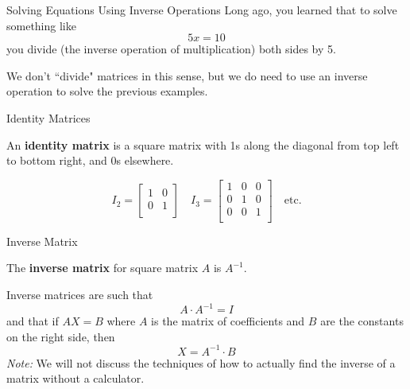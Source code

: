 \documentclass[t]{beamer}
\begin{document}
\begin{frame}{Solving Equations Using Inverse Operations}
Long ago, you learned that to solve something like
\[ 5x = 10 \]
you divide (the inverse operation of multiplication) both sides by 5.	\newline\\	\pause

We don't ``divide" matrices in this sense, but we do need to use an inverse operation to solve the previous examples.
\end{frame}

\begin{frame}{Identity Matrices}
\begin{tcolorbox}[colframe=green!20!black, colback = green!30!white,title=\textbf{Identity Matrix}]
An \textbf{identity matrix} is a square matrix with 1s along the diagonal from top left to bottom right, and 0s elsewhere.
\end{tcolorbox}
\vspace{10pt}	\pause
\[
I_2 = \begin{bmatrix}
1 & 0 \\
0 & 1 \\
\end{bmatrix}
\quad
I_3 = \begin{bmatrix}
1 & 0 & 0 \\
0 & 1 & 0 \\
0 & 0 & 1 \\
\end{bmatrix}
\quad
\text{etc.}
\]
\end{frame}

\begin{frame}{Inverse Matrix}
\begin{tcolorbox}[colframe=green!20!black, colback = green!30!white,title=\textbf{Inverse Matrix}]
The \textbf{inverse matrix} for square matrix $A$ is $A^{-1}$.
\end{tcolorbox}
\vspace{10pt}	\pause
Inverse matrices are such that 
\[
A \cdot A^{-1} = I
\]	\pause
and that if $AX = B$ where $A$ is the matrix of coefficients and $B$ are the constants on the right side, then
\[
X = A^{-1} \cdot B
\]
\pause
\emph{Note:} We will not discuss the techniques of how to actually find the inverse of a matrix without a calculator.
\end{frame}
\end{document}
